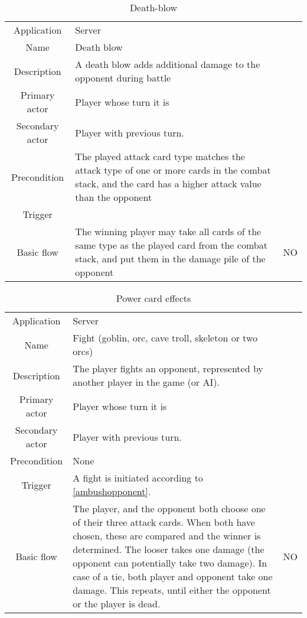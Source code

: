 \documentclass[a4paper,10pt]{report}
\begin{document}
\begin{table}
\caption{Death-blow}
\label{fight_deathblow}
\begin{tabular}{|c| p{9cm}|c}
\hline
Application & Server & \\
Name & Death blow & \\
Description & A death blow adds additional damage to the opponent during battle & \\
Primary actor & Player whose turn it is & \\
Secondary actor & Player with previous turn. & \\
Precondition & The played attack card type matches the attack type of one or more cards in the combat stack, and the card has a higher attack value than the opponent & \\
Trigger &  & \\ \hline
Basic flow & The winning player may take all cards of the same type as the played card from the combat stack, and put them in the damage pile of the opponent & NO\\
\hline
\end{tabular}
\end{table}



\begin{table}
\caption{Power card effects}
\label{fight_powercard}
\begin{tabular}{|c| p{9cm}|c}
\hline
Application & Server & \\
Name & Fight (goblin, orc, cave troll, skeleton or two orcs) & \\
Description & The player fights an opponent, represented by another player in the game (or AI). & \\
Primary actor & Player whose turn it is & \\
Secondary actor & Player with previous turn. & \\
Precondition & None & \\
Trigger & A fight is initiated according to \ref{ambushopponent}. & \\ \hline
Basic flow & The player, and the opponent both choose one of their three attack cards. When both have chosen, these are compared and the winner is determined. The looser takes one damage (the opponent can potentially take two damage). In case of a tie, both player and opponent take one damage. This repeats, until either the opponent or the player is dead. & NO\\ \hline
\hline
\end{tabular}
\end{table}
\end{document}
